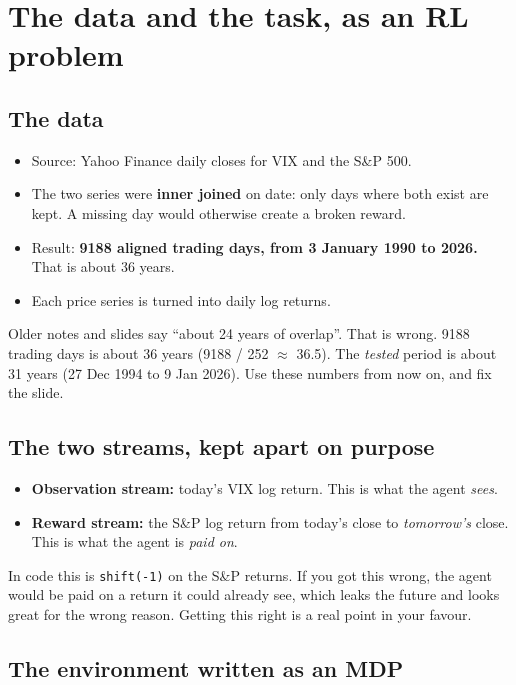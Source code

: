 \documentclass[11pt,a4paper]{article}
\begin{document}
\section{The data and the task, as an RL problem}

\subsection{The data}
\begin{itemize}
  \item Source: Yahoo Finance daily closes for VIX and the S\&P 500.
  \item The two series were \textbf{inner joined} on date: only days where both exist are
        kept. A missing day would otherwise create a broken reward.
  \item Result: \textbf{9188 aligned trading days, from 3 January 1990 to 2026.} That is
        about 36 years.
  \item Each price series is turned into daily log returns.
\end{itemize}

\begin{honest}
Older notes and slides say ``about 24 years of overlap''. That is wrong. 9188 trading days
is about 36 years (9188 / 252 $\approx$ 36.5). The \emph{tested} period is about 31 years
(27 Dec 1994 to 9 Jan 2026). Use these numbers from now on, and fix the slide.
\end{honest}

\subsection{The two streams, kept apart on purpose}
\begin{itemize}
  \item \textbf{Observation stream:} today's VIX log return. This is what the agent
        \emph{sees}.
  \item \textbf{Reward stream:} the S\&P log return from today's close to \emph{tomorrow's}
        close. This is what the agent is \emph{paid on}.
\end{itemize}
In code this is \texttt{shift(-1)} on the S\&P returns. If you got this wrong, the agent
would be paid on a return it could already see, which leaks the future and looks great
for the wrong reason. Getting this right is a real point in your favour.

\subsection{The environment written as an MDP}
\end{document}
